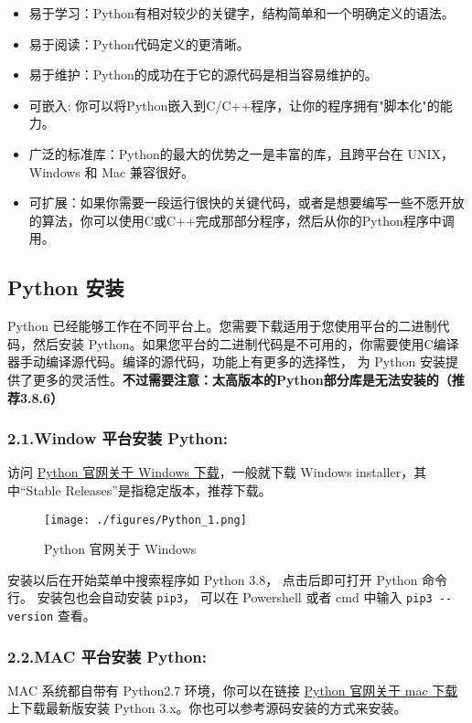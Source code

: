 \begin{itemize}
\item 易于学习：Python有相对较少的关键字，结构简单和一个明确定义的语法。
\item 易于阅读：Python代码定义的更清晰。
\item 易于维护：Python的成功在于它的源代码是相当容易维护的。
\item 可嵌入: 你可以将Python嵌入到C/C++程序，让你的程序拥有"脚本化"的能力。
\item 广泛的标准库：Python的最大的优势之一是丰富的库，且跨平台在 UNIX，Windows 和 Mac 兼容很好。
\item 可扩展：如果你需要一段运行很快的关键代码，或者是想要编写一些不愿开放的算法，你可以使用C或C++完成那部分程序，然后从你的Python程序中调用。
\end{itemize}


\subsection{Python 安装}\label{Python_sub2}
Python 已经能够工作在不同平台上。您需要下载适用于您使用平台的二进制代码，然后安装 Python。如果您平台的二进制代码是不可用的，你需要使用C编译器手动编译源代码。编译的源代码，功能上有更多的选择性， 为 Python 安装提供了更多的灵活性。\textbf{不过需要注意：太高版本的Python部分库是无法安装的（推荐3.8.6）}

\subsubsection{2.1.Window 平台安装 Python:}
访问 \href{https://www.python.org/downloads/windows/}{Python 官网关于 Windows 下载}，一般就下载  Windows installer，其中“Stable Releases”是指稳定版本，推荐下载。
\begin{figure}[ht]
\centering
\texttt{[image: ./figures/Python\_1.png]}
\caption{Python 官网关于 Windows} \label{Python_fig1}
\end{figure}
安装以后在开始菜单中搜索程序如 Python 3.8， 点击后即可打开 Python 命令行。 安装包也会自动安装 \verb|pip3|， 可以在 Powershell 或者 cmd 中输入 \verb|pip3 --version| 查看。

\subsubsection{2.2.MAC 平台安装 Python:}
MAC 系统都自带有 Python2.7 环境，你可以在链接 \href{https://www.python.org/downloads/mac-osx/}{Python 官网关于 mac 下载} 上下载最新版安装 Python 3.x。你也可以参考源码安装的方式来安装。

